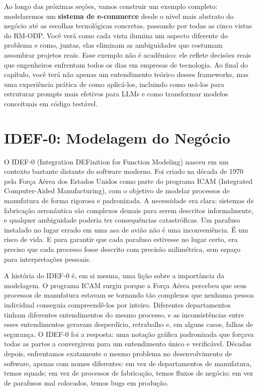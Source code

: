 Ao longo das próximas seções, vamos construir um exemplo completo: modelaremos
um \textbf{sistema de e-commerce} desde o nível mais abstrato do negócio até as
escolhas tecnológicas concretas, passando por todas as cinco vistas do RM-ODP.
Você verá como cada vista ilumina um aspecto diferente do problema e como, juntas,
elas eliminam as ambiguidades que costumam assombrar projetos reais. Esse exemplo
não é acadêmico: ele reflete decisões reais que engenheiros enfrentam todos os
dias em empresas de tecnologia. Ao final do capítulo, você terá não apenas um
entendimento teórico desses frameworks, mas uma experiência prática de como
aplicá-los, incluindo como usá-los para estruturar prompts mais efetivos para
LLMs e como transformar modelos conceituais em código testável.


\section{IDEF-0: Modelagem do Negócio}

O IDEF-0 (Integration DEFinition for Function Modeling) nasceu em um contexto
bastante distante do software moderno. Foi criado na década de 1970 pela Força
Aérea dos Estados Unidos como parte do programa ICAM (Integrated Computer-Aided
Manufacturing), com o objetivo de modelar processos de manufatura de forma
rigorosa e padronizada. A necessidade era clara: sistemas de fabricação aeronáutica
são complexos demais para serem descritos informalmente, e qualquer ambiguidade
poderia ter consequências catastróficas. Um parafuso instalado no lugar errado
em uma asa de avião não é uma inconveniência. É um risco de vida. E para
garantir que cada parafuso estivesse no lugar certo, era preciso que cada processo
fosse descrito com precisão milimétrica, sem espaço para interpretações pessoais.

A história do IDEF-0 é, em si mesma, uma lição sobre a importância da modelagem.
O programa ICAM surgiu porque a Força Aérea percebeu que seus processos de
manufatura estavam se tornando tão complexos que nenhuma pessoa individual
conseguia compreendê-los por inteiro. Diferentes departamentos tinham diferentes
entendimentos do mesmo processo, e as inconsistências entre esses entendimentos
geravam desperdício, retrabalho e, em alguns casos, falhas de segurança. O
IDEF-0 foi a resposta: uma notação gráfica padronizada que forçava todas as
partes a convergirem para um entendimento único e verificável. Décadas depois,
enfrentamos exatamente o mesmo problema no desenvolvimento de software, apenas
com nomes diferentes: em vez de departamentos de manufatura, temos squads; em
vez de processos de fabricação, temos fluxos de negócio; em vez de parafusos
mal colocados, temos bugs em produção.

